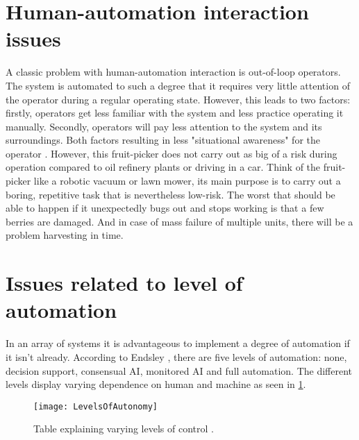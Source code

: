 \documentclass[%
oneside,    %
project,    %
nosummary   %
]{USN-MSc}
\begin{document}
\section{Human-automation interaction issues}
\label{sec:humanAutomationIssues}
A classic problem with human-automation interaction is out-of-loop operators. The system is automated to such a degree that it requires very little attention of the operator during a regular operating state. However, this leads to two factors: firstly, operators get less familiar with the system and less practice operating it manually. Secondly, operators will pay less attention to the system and its surroundings. Both factors resulting in less "situational awareness" for the operator \cite{Gruhn2011HumanMI}. However, this fruit-picker does not carry out as big of a risk during operation compared to oil refinery plants or driving in a car. Think of the fruit-picker like a robotic vacuum or lawn mower, its main purpose is to carry out a boring, repetitive task that is nevertheless low-risk. The worst that should be able to happen if it unexpectedly bugs out and stops working is that a few berries are damaged. And in case of mass failure of multiple units, there will be a problem harvesting in time. \cite{NozzleWi94:online}
\section{Issues related to level of automation}
\label{sec:issuesLevelAutomation}
In an array of systems it is advantageous to implement a degree of automation if it isn't already. According to Endsley \cite{article}, there are five levels of automation: none, decision support, consensual AI, monitored AI and full automation. The different levels display varying dependence on human and machine as seen in \ref{fig:levelsOfAuto}.

\begin{figure}[!ht]
  \centering
  \texttt{[image: LevelsOfAutonomy]}
  \caption{Table explaining varying levels of control \cite{article}.}
  \label{fig:levelsOfAuto}
\end{figure}
\end{document}
